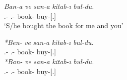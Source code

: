 \begin{exe}
    \ex \label{mariturkish}
    \begin{xlist}
        \ex 
        \gll 
        \textit{Ban-a} \textit{ve} \textit{san-a} \textit{kitab-ı} \textit{bul-du.} \\ {\First}.{\Sg}-{\Dat} {\And} {\Second}.{\Sg}-{\Dat} book-{\Acc} buy-{\Pst}[{\Third}.{\Sg}] \\
        \glt `S/he bought the book for me and you'
        
        \ex 
        \gll 
        \textit{*Ben-} \textit{ve} \textit{san-a} \textit{kitab-ı} \textit{bul-du.} \\ {\First}.{\Sg}-{\Dat} {\And} {\Second}.{\Sg}-{\Dat} book-{\Acc} buy-{\Pst}[{\Third}.{\Sg}] \\
        
        \ex 
        \gll 
        \textit{*Ban-} \textit{ve} \textit{san-a} \textit{kitab-ı} \textit{bul-du.} \\ {\First}.{\Sg}-{\Dat} {\And} {\Second}.{\Sg}-{\Dat} book-{\Acc} buy-{\Pst}[{\Third}.{\Sg}] \\
    \end{xlist}
\end{exe}

